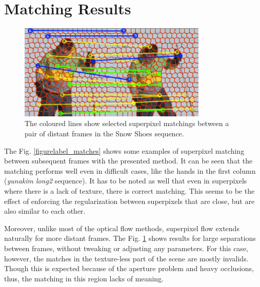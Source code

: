 \section{Matching Results}

   \begin{figure}[thpb]
      \centering
      \includegraphics[width=0.8\textwidth]{../images/matches_snowshoes2.png}
      \caption{The coloured lines show selected superpixel
		matchings between a pair of distant frames in the Snow Shoes sequence.}
      \label{figurelabel_matchessnow}
   \end{figure}   
	\setlength{\belowcaptionskip}{-10pt}
	
The Fig. \ref{figurelabel_matches} shows some examples of superpixel matching between subsequent frames with the presented method. 
It can be seen that the matching performs well even in difficult cases, like the hands in the first column ({\it yunakim long2} sequence). It has to be noted
as well that even in superpixels where there is a lack of texture, there is correct matching. This seems to be
the effect of enforcing the regularization between superpixels that are close, but are also similar to
each other.
 
Moreover, unlike most of the optical flow methods, superpixel flow extends 
 naturally for more distant frames. 
The Fig. \ref{figurelabel_matchessnow} shows
 results for large separations between frames, without tweaking or adjusting any parameters. 
For this case, however, the matches in the texture-less part of the scene
 are mostly invalids. Though this is expected because of the aperture problem and
 heavy occlusions, thus, the matching in this region lacks of meaning.
